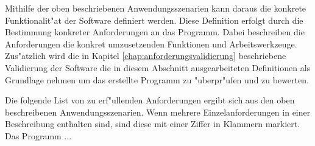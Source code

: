 Mithilfe der oben beschriebenen Anwendungsszenarien kann daraus die konkrete Funktionalit"at der Software definiert werden.
Diese Definition erfolgt durch die Bestimmung konkreter Anforderungen an das Programm.
Dabei beschreiben die Anforderungen die konkret umzusetzenden Funktionen und Arbeitswerkzeuge.
Zus"atzlich wird die in Kapitel \ref{chap:anforderungsvalidierung} beschriebene Validierung der Software die in diesem Abschnitt ausgearbeiteten Definitionen als Grundlage nehmen um das erstellte Programm zu "uberpr"ufen und zu bewerten.

Die folgende List von zu erf"ullenden Anforderungen ergibt sich aus den oben beschreibenen Anwendungsszenarien.
Wenn mehrere Einzelanforderungen in einer Beschreibung enthalten sind, sind diese mit einer Ziffer in Klammern markiert.
Das Programm ...
\renewcommand{\theenumi}{\Alph{enumi}}
\renewcommand{\labelenumi}{\theenumi )}
\newcommand{\AF}[1]{\item \label{AF:#1}}
